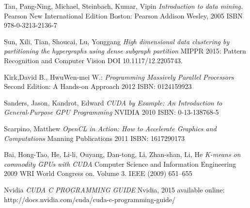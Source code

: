 \begin{thebibliography}{99}
{\sc Tan,} Pang-Ning, {\sc Michael,} Steinbach, {\sc Kumar,} Vipin
\emph{Introduction to data mining.}
Pearson New International Edition
Boston: Pearson Addison Wesley, 2005
ISBN 978-0-3213-2136-7

{\sc Sun,} Xili, {\sc Tian,} Shoucai, {\sc Lu,} Yonggang
\emph{High dimensional data clustering by partitioning the hypergraphs using dense subgraph partition}
MIPPR 2015: Pattern Recognition and Computer Vision
DOI 10.1117/12.2205743.

{\sc Kirk,}David B., {\sc Hwu}Wen-mei W.:
\emph{Programming Massively Parallel Processors}
Second Edition: A Hands-on Approach
2012
ISBN: 0124159923 

{\sc Sanders,} Jason, {\sc Kandrot,} Edward
\emph{CUDA by Example: An Introduction to General-Purpose GPU Programming}
NVIDIA
2010
ISBN: 0-13-138768-5 

{\sc Scarpino,} Matthew
\emph{OpenCL in Action: How to Accelerate Graphics and Computations}
Manning Publications
2011
ISBN: 1617290173 

{\sc Bai,} Hong-Tao, {\sc He,} Li-li, {\sc Ouyang,} Dan-tong, {\sc Li,} Zhan-shan, {\sc Li, } He
\emph{K-means on commodity GPUs with CUDA}
 Computer Science and Information Engineering
 2009
 WRI World Congress on. Volume 3.
 IEEE (2009) 651–655 

Nvidia
\emph{CUDA C PROGRAMMING GUIDE}
Nvidia, 2015
available online: http://docs.nvidia.com/cuda/cuda-c-programming-guide/
\end{thebibliography}
